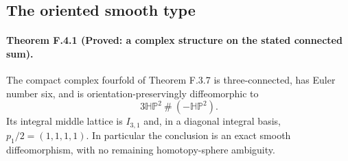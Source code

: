 \subsection{The oriented smooth type}

\paragraph{Theorem F.4.1 (Proved: a complex structure on the stated connected sum).}
The compact complex fourfold of Theorem F.3.7 is three-connected,
has Euler number six, and is orientation-preservingly diffeomorphic to
\[
 3\mathbb H\mathbb P^2\ \#\ (-\mathbb H\mathbb P^2).
 \tag{F.25}
\]
Its integral middle lattice is $I_{3,1}$ and, in a diagonal integral
basis, $p_1/2=(1,1,1,1)$.  In particular the conclusion is an exact
smooth diffeomorphism, with no remaining homotopy-sphere ambiguity.

